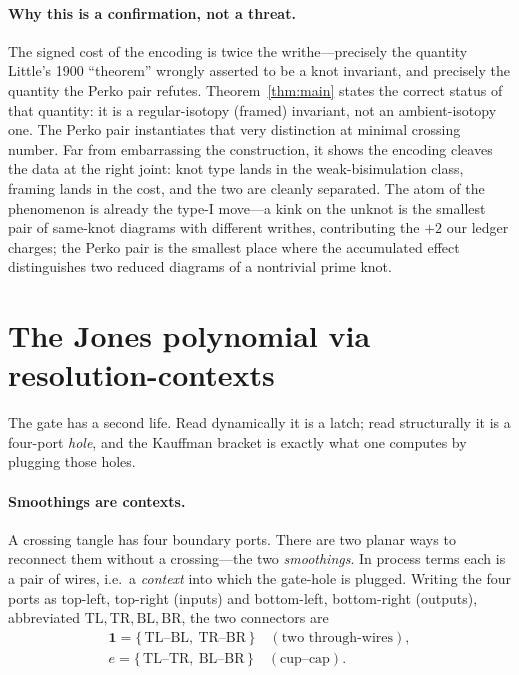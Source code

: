 \documentclass[11pt]{article}
\theoremstyle{definition}
\begin{document}
\paragraph{Why this is a confirmation, not a threat.}
The signed cost of the encoding is twice the writhe---precisely the quantity
Little's 1900 ``theorem'' wrongly asserted to be a knot invariant, and precisely
the quantity the Perko pair refutes. Theorem~\ref{thm:main} states the correct
status of that quantity: it is a regular-isotopy (framed) invariant, not an
ambient-isotopy one. The Perko pair instantiates that very distinction at minimal
crossing number. Far from embarrassing the construction, it shows the encoding
cleaves the data at the right joint: knot type lands in the weak-bisimulation
class, framing lands in the cost, and the two are cleanly separated. The atom of
the phenomenon is already the type-I move---a kink on the unknot is the smallest
pair of same-knot diagrams with different writhes, contributing the $+2$ our
ledger charges; the Perko pair is the smallest place where the accumulated effect
distinguishes two reduced diagrams of a nontrivial prime knot.

\section{The Jones polynomial via resolution-contexts}\label{sec:jones}

The gate has a second life. Read dynamically it is a latch; read structurally it is
a four-port \emph{hole}, and the Kauffman bracket is exactly what one computes by
plugging those holes.

\paragraph{Smoothings are contexts.}
A crossing tangle has four boundary ports. There are two planar ways to reconnect
them without a crossing---the two \emph{smoothings}. In process terms each is a
pair of wires, i.e.\ a \emph{context} into which the gate-hole is plugged. Writing
the four ports as top-left, top-right (inputs) and bottom-left, bottom-right
(outputs), abbreviated $\mathrm{TL},\mathrm{TR},\mathrm{BL},\mathrm{BR}$, the two
connectors are
\begin{gather*}
\mathbf{1} = \{\,\mathrm{TL}\text{--}\mathrm{BL},\ \mathrm{TR}\text{--}\mathrm{BR}\,\}
\quad(\text{two through-wires}),\\[2pt]
e = \{\,\mathrm{TL}\text{--}\mathrm{TR},\ \mathrm{BL}\text{--}\mathrm{BR}\,\}
\quad(\text{cup--cap}).
\end{gather*}
\end{document}
